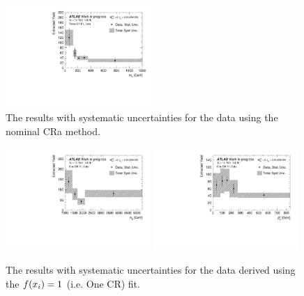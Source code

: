 \begin{figure}[t]
  \includegraphics[width=0.49\textwidth]{plots/diffx/final/data/3cr/Extracted_Yield_data_ly_m_3cr_QCD_Sh2211_0p01sigma}
  \caption{The \new results with systematic uncertainties for the data using the nominal CRa method.\label{fig:vbswy:3cr_nEW}}
\end{figure}

\begin{figure}[t]
  \centering
  \includegraphics[width=0.49\textwidth]{plots/diffx/final/data/1cr/Extracted_Yield_data_mjj_1cr_QCD_Sh2211_0p01sigma}
  \includegraphics[width=0.49\textwidth]{plots/diffx/final/data/1cr/Extracted_Yield_data_jj_pt_1cr_QCD_Sh2211_0p01sigma}
  \caption{The \new results with systematic uncertainties for the data derived using the $f(x_i)=1$ (i.e. One CR) fit.\label{fig:vbswy:1cr_nEW}}
\end{figure}

